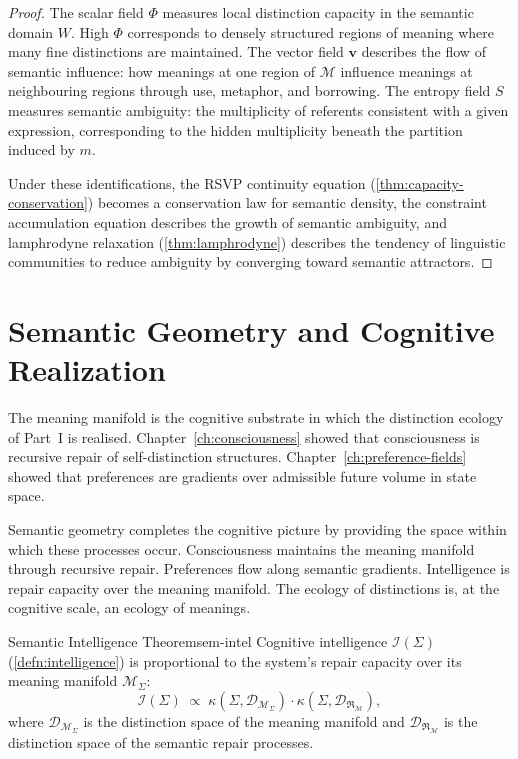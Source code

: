\documentclass[12pt,twoside,openright]{book}
\newcommand{\repair}{\mathfrak{R}}
\begin{document}
\begin{proof}
  The scalar field $\Phi$ measures local distinction
  capacity in the semantic domain $W$.
  High $\Phi$ corresponds to densely structured
  regions of meaning where many fine distinctions are
  maintained.
  The vector field $\mathbf{v}$ describes the
  flow of semantic influence: how meanings at one
  region of $\mathcal{M}$ influence meanings at
  neighbouring regions through use, metaphor, and
  borrowing.
  The entropy field $S$ measures semantic ambiguity:
  the multiplicity of referents consistent with a
  given expression, corresponding to the hidden
  multiplicity beneath the partition induced by $m$.

  Under these identifications, the RSVP continuity
  equation (\cref{thm:capacity-conservation}) becomes
  a conservation law for semantic density, the
  constraint accumulation equation describes the
  growth of semantic ambiguity, and lamphrodyne
  relaxation (\cref{thm:lamphrodyne}) describes
  the tendency of linguistic communities to reduce
  ambiguity by converging toward semantic attractors.
\end{proof}

\section{Semantic Geometry and Cognitive Realization}

The meaning manifold is the cognitive substrate in
which the distinction ecology of Part~I is realised.
Chapter~\ref{ch:consciousness} showed that
consciousness is recursive repair of self-distinction
structures. Chapter~\ref{ch:preference-fields} showed
that preferences are gradients over admissible future
volume in state space.

Semantic geometry completes the cognitive picture by
providing the space within which these processes occur.
Consciousness maintains the meaning manifold through
recursive repair. Preferences flow along semantic
gradients. Intelligence is repair capacity over
the meaning manifold. The ecology of distinctions
is, at the cognitive scale, an ecology of meanings.

\begin{theorem}{Semantic Intelligence Theorem}{sem-intel}
  Cognitive intelligence $\mathcal{I}(\Sigma)$
  (\cref{defn:intelligence}) is proportional to
  the system's repair capacity over its meaning
  manifold $\mathcal{M}_\Sigma$:
  \[
    \mathcal{I}(\Sigma)
    \;\propto\;
    \kappa(\Sigma, \mathcal{D}_{\mathcal{M}_\Sigma})
    \cdot
    \kappa(\Sigma, \mathcal{D}_{\repair_\mathcal{M}}),
  \]
  where $\mathcal{D}_{\mathcal{M}_\Sigma}$ is the
  distinction space of the meaning manifold and
  $\mathcal{D}_{\repair_\mathcal{M}}$ is the
  distinction space of the semantic repair processes.
\end{theorem}
\end{document}
